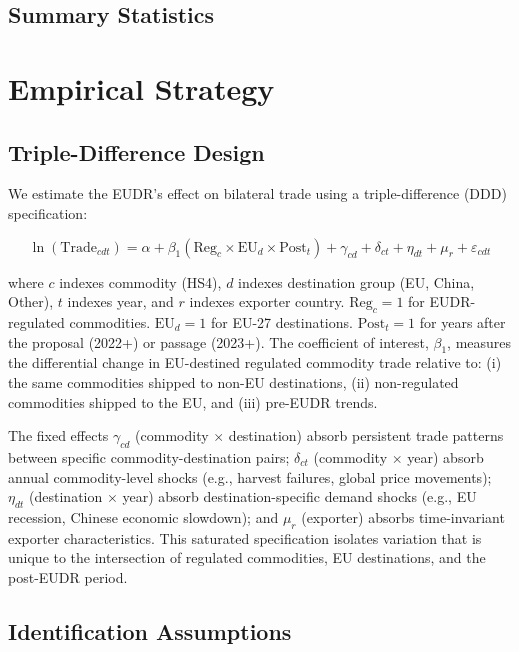 \documentclass[12pt]{article}
\begin{document}
\subsection{Summary Statistics}




\section{Empirical Strategy}

\subsection{Triple-Difference Design}

We estimate the EUDR's effect on bilateral trade using a triple-difference (DDD) specification:

\begin{equation}\label{eq:ddd}
\ln(\text{Trade}_{cdt}) = \alpha + \beta_1 (\text{Reg}_c \times \text{EU}_d \times \text{Post}_t) + \gamma_{cd} + \delta_{ct} + \eta_{dt} + \mu_r + \varepsilon_{cdt}
\end{equation}

\noindent where $c$ indexes commodity (HS4), $d$ indexes destination group (EU, China, Other), $t$ indexes year, and $r$ indexes exporter country. $\text{Reg}_c = 1$ for EUDR-regulated commodities. $\text{EU}_d = 1$ for EU-27 destinations. $\text{Post}_t = 1$ for years after the proposal (2022+) or passage (2023+). The coefficient of interest, $\beta_1$, measures the differential change in EU-destined regulated commodity trade relative to: (i) the same commodities shipped to non-EU destinations, (ii) non-regulated commodities shipped to the EU, and (iii) pre-EUDR trends.

The fixed effects $\gamma_{cd}$ (commodity $\times$ destination) absorb persistent trade patterns between specific commodity-destination pairs; $\delta_{ct}$ (commodity $\times$ year) absorb annual commodity-level shocks (e.g., harvest failures, global price movements); $\eta_{dt}$ (destination $\times$ year) absorb destination-specific demand shocks (e.g., EU recession, Chinese economic slowdown); and $\mu_r$ (exporter) absorbs time-invariant exporter characteristics. This saturated specification isolates variation that is unique to the intersection of regulated commodities, EU destinations, and the post-EUDR period.

\subsection{Identification Assumptions}
\end{document}
